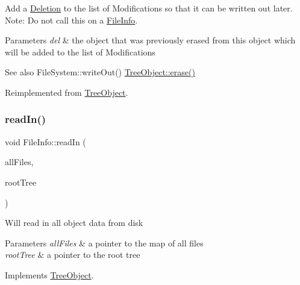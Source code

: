 Add a \mbox{\hyperlink{classDeletion}{Deletion}} to the list of Modifications so that it can be written out later. Note\+: Do not call this on a \mbox{\hyperlink{classFileInfo}{File\+Info}}. 
\begin{DoxyParams}{Parameters}
{\em del} & the object that was previously erased from this object which will be added to the list of Modifications \\
\hline
\end{DoxyParams}
\begin{DoxySeeAlso}{See also}
File\+System\+::write\+Out() \mbox{\hyperlink{classTreeObject_a453b5df2a9ef7c6faad259900d574ee2}{Tree\+Object\+::erase()}} 
\end{DoxySeeAlso}


Reimplemented from \mbox{\hyperlink{classTreeObject_afcc4b3928d2b77ff080aa229a9706215}{Tree\+Object}}.

\mbox{\label{classFileInfo_a0e74605dd535e73027ad1c1c6242db09}} 
\subsubsection{\texorpdfstring{read\+In()}{readIn()}}
{\footnotesize\ttfamily void File\+Info\+::read\+In (\begin{DoxyParamCaption}\item[{unordered\+\_\+multimap$<$ string, \mbox{\hyperlink{classFileInfo}{File\+Info}} $\ast$$>$ $\ast$}]{all\+Files,  }\item[{\mbox{\hyperlink{classRootTree}{Root\+Tree}} $\ast$}]{root\+Tree }\end{DoxyParamCaption})\hspace{0.3cm}{\ttfamily [virtual]}}

Will read in all object data from disk 
\begin{DoxyParams}{Parameters}
{\em all\+Files} & a pointer to the map of all files \\
\hline
{\em root\+Tree} & a pointer to the root tree \\
\hline
\end{DoxyParams}


Implements \mbox{\hyperlink{classTreeObject_a8247e79f2b4c1760649ac6f1af1c583f}{Tree\+Object}}.

\mbox{\label{classFileInfo_a15d8f9279f1d60e4db4618cb81e68414}} 
